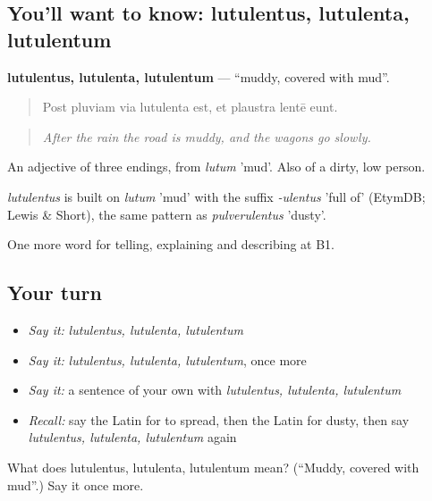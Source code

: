 \subsection*{You'll want to know: lutulentus, lutulenta, lutulentum}
\textbf{lutulentus, lutulenta, lutulentum} — \textquotedblleft{}muddy, covered with mud\textquotedblright{}.

\begin{quote}
Post pluviam via lutulenta est, et plaustra lentē eunt.
\end{quote}

\begin{quote}
\emph{After the rain the road is muddy, and the wagons go slowly.}
\end{quote}

An adjective of three endings, from \emph{lutum} 'mud'. Also of a dirty, low person.

\begin{cousinweb}
\emph{lutulentus} is built on \emph{lutum} 'mud' with the suffix \emph{-ulentus} 'full of' (EtymDB; Lewis \& Short), the same pattern as \emph{pulverulentus} 'dusty'.
\end{cousinweb}

\begin{grammarlens}[title={What you've built}]
One more word for telling, explaining and describing at B1.
\end{grammarlens}

\subsection*{Your turn}
\begin{itemize}
\raggedright
  \item \emph{Say it:} \emph{lutulentus, lutulenta, lutulentum}
  \item \emph{Say it:} \emph{lutulentus, lutulenta, lutulentum}, once more
  \item \emph{Say it:} a sentence of your own with \emph{lutulentus, lutulenta, lutulentum}
  \item \emph{Recall:} say the Latin for to spread, then the Latin for dusty, then say \emph{lutulentus, lutulenta, lutulentum} again
\end{itemize}

\begin{tcolorbox}[breakable,colback=teal!4,colframe=teal!35!black,title={Before you move on}]
What does lutulentus, lutulenta, lutulentum mean? (\textquotedblleft{}Muddy, covered with mud\textquotedblright{}.) Say it once more.
\end{tcolorbox}
